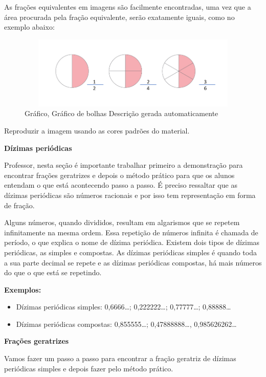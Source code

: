 As frações equivalentes em imagens são facilmente encontradas, uma vez
que a área procurada pela fração equivalente, serão exatamente iguais,
como no exemplo abaixo:

\begin{figure}
\centering
\includegraphics[width=5.15682in,height=1.36473in]{./imgSAEB_7_MAT/media/image6.png}
\caption{Gráfico, Gráfico de bolhas Descrição gerada automaticamente}
\end{figure}

Reproduzir a imagem usando as cores padrões do material.

\textbf{Dízimas periódicas}

Professor, nesta seção é importante trabalhar primeiro a demonstração
para encontrar frações geratrizes e depois o método prático para que os
alunos entendam o que está acontecendo passo a passo. É preciso
ressaltar que as dízimas periódicas são números racionais e por isso tem
representação em forma de fração.

Alguns números, quando divididos, resultam em algarismos que se repetem
infinitamente na mesma ordem. Essa repetição de números infinita é
chamada de período, o que explica o nome de dízima periódica. Existem
dois tipos de dízimas periódicas, as simples e compostas. As dízimas
periódicas simples é quando toda a sua parte decimal se repete e as
dízimas periódicas compostas, há mais números do que o que está se
repetindo.

\textbf{Exemplos:}

\begin{itemize}
\item
  Dízimas periódicas simples: 0,6666\ldots; 0,222222\ldots;
  0,77777\ldots; 0,88888\ldots{}
\item
  Dízimas periódicas compostas: 0,855555\ldots; 0,47888888\ldots,
  0,985626262\ldots{}
\end{itemize}

\textbf{Frações geratrizes}

Vamos fazer um passo a passo para encontrar a fração geratriz de dízimas
periódicas simples e depois fazer pelo método prático.

